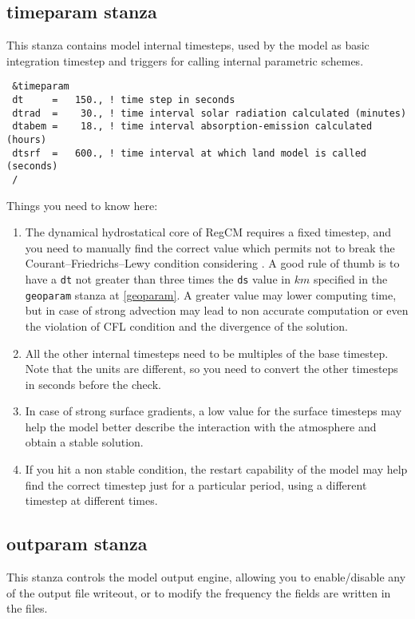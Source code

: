 \subsection{timeparam stanza}

This stanza contains model internal timesteps, used by the model as basic
integration timestep and triggers for calling internal parametric schemes.

{\footnotesize
\begin{Verbatim}
 &timeparam
 dt     =   150., ! time step in seconds
 dtrad  =    30., ! time interval solar radiation calculated (minutes)
 dtabem =    18., ! time interval absorption-emission calculated (hours)
 dtsrf  =   600., ! time interval at which land model is called (seconds)
 /
\end{Verbatim}
}

Things you need to know here:

\begin{enumerate}
\item The dynamical hydrostatical core of RegCM requires a fixed timestep,
and you need to manually find the correct value which permits not to break
the Courant–Friedrichs–Lewy condition considering \cite{CFL}. A good rule
of thumb is to have a \verb=dt= not greater than three times the \verb=ds=
value in $km$ specified in the \verb=geoparam= stanza at \ref{geoparam}.
A greater value may lower computing time, but in case of strong advection
may lead to non accurate computation or even the violation of CFL condition
and the divergence of the solution.
\item All the other internal timesteps need to be multiples of the base timestep.
Note that the units are different, so you need to convert the other timesteps
in seconds before the check.
\item In case of strong surface gradients, a low value for the surface timesteps
may help the model better describe the interaction with the atmosphere and
obtain a stable solution.
\item If you hit a non stable condition, the restart capability of the model
may help find the correct timestep just for a particular period, using a
different timestep at different times.
\end{enumerate}

\subsection{outparam stanza}

This stanza controls the model output engine, allowing you to enable/disable
any of the output file writeout, or to modify the frequency the fields are
written in the files.

